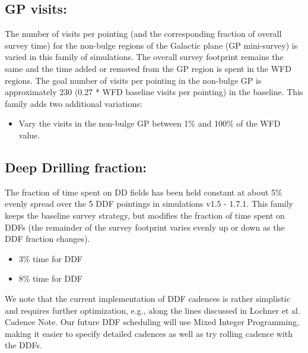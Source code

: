 \subsection{GP visits: }
The number of visits per pointing (and the corresponding fraction of overall survey time) for the non-bulge regions of the Galactic plane (GP mini-survey) is varied in this family of simulations. The overall survey footprint remains the same and the time added or removed from the GP region is spent in the WFD regions. The goal number of visits per pointing in the non-bulge GP is approximately 230 (0.27 * WFD baseline visits per pointing)  in the baseline. This family adds two additional variations:
\begin{itemize}
\item Vary the visits in the non-bulge GP between 1\% and 100\% of the WFD value. 
\end{itemize}

\subsection{Deep Drilling fraction:}
The fraction of time spent on DD fields has been held constant at about 5\% evenly spread over the 5 DDF pointings in simulations v1.5 - 1.7.1. This family keeps the baseline survey strategy, but modifies the fraction of time spent on DDFs (the remainder of the survey footprint varies evenly up or down as the DDF fraction changes).\begin{itemize}
\item 3\% time for DDF
\item 8\% time for DDF
\end{itemize}
We note that the current implementation of DDF cadences is rather simplistic and requires further optimization, e.g., along the lines discussed in Lochner et al. Cadence Note. Our future DDF scheduling will use Mixed Integer Programming, making it easier to specify detailed cadences as well as try rolling cadence with the DDFs.

